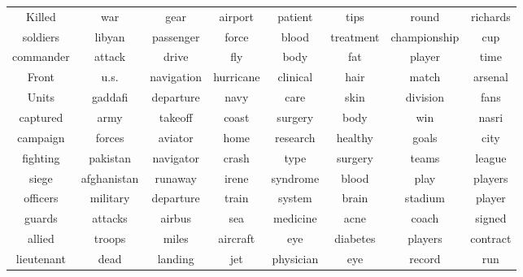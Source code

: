 \documentclass{sig-alternate-05-2015}
\begin{document}
\begin{table}[ht]
\begin{tabular}{|cc|cc|cc|cc|}
Killed & war & gear & airport & patient & tips & round & richards \\ 
soldiers & libyan & passenger & force & blood & treatment & championship & cup \\ 
commander & attack & drive & fly & body & fat & player & time \\ 
Front & u.s. & navigation & hurricane & clinical & hair & match & arsenal \\ 
Units & gaddafi & departure & navy & care & skin & division & fans \\ 
captured & army & takeoff & coast & surgery & body & win & nasri \\ 
campaign & forces & aviator & home & research & healthy & goals & city \\ 
fighting & pakistan & navigator & crash & type & surgery & teams & league \\ 
siege & afghanistan & runaway & irene & syndrome & blood & play & players \\ 
officers & military & departure & train & system & brain & stadium & player \\ 
guards & attacks & airbus & sea & medicine & acne & coach & signed \\ 
allied & troops & miles & aircraft & eye & diabetes & players & contract \\ 
lieutenant & dead & landing & jet & physician & eye & record & run \\ \hline
\end{tabular}
\end{table}
\end{document}
